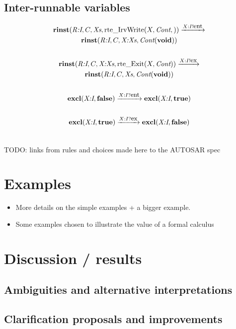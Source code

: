 \documentclass[twocolumn]{article}
\newcommand{\V}[1]{\mbox{\it #1}}
\newcommand{\Cont}{\V{Cont}}
\newcommand{\Xs}{\V{Xs}}
\newcommand{\void}{\mbox{\bf void}}
\newcommand{\true}{\mbox{\bf true}}
\newcommand{\false}{\mbox{\bf false}}
\newcommand{\adr}[1]{\mbox{\em #1}}
\newcommand{\rinst}[4]{\mbox{\bf rinst}(#1,#2,#3,#4)}
\newcommand{\excl}[2]{\mbox{\bf excl}(#1,#2)}
\newcommand{\Exit}[2]{\mbox{rte\_Exit}(#1,#2)}
\newcommand{\IrvWrite}[3]{\mbox{rte\_IrvWrite}(#1,#2,#3)}
\newcommand{\red}[1]{\xrightarrow{#1}}
\newcommand{\say}[2]{#1 ! #2}
\newcommand{\hear}[2]{#1 ? #2}
\newcommand{\ent}{\mbox{\small ent}}
\newcommand{\ex}{\mbox{\small ex}}
\begin{document}
\subsection{Inter-runnable variables}

\begin{gather*}
	\rinst{\adr{R:I}}{C}{\Xs}{\IrvWrite{X}{\Cont}}  \red{\say{X:I}{\ent}}  \\
		\rinst{\adr{R:I}}{C}{\adr{X:Xs}}{\Cont(\void)} \\
	\\
	\rinst{\adr{R:I}}{C}{\adr{X:Xs}}{\Exit{X}{\Cont}}  \red{\say{X:I}{\ex}}  \\
		\rinst{\adr{R:I}}{C}{\Xs}{\Cont(\void)} \\
	\\
	\excl{\adr{X:I}}{\false} \red{\hear{X:I}{\ent}} \excl{\adr{X:I}}{\true} \\
	\\
	\excl{\adr{X:I}}{\true} \red{\hear{X:I}{\ex}} \excl{\adr{X:I}}{\false} \\
	\\
\end{gather*}


TODO: links from rules and choices made here to the AUTOSAR spec

\section{Examples}
\label{sec:Examples}

\begin{itemize}
\item More details on the simple examples + a bigger example.
\item Some examples chosen to illustrate the value of a formal calculus
\end{itemize}

\section{Discussion / results}
\label{sec:Disc}

\subsection{Ambiguities and alternative interpretations}
\label{sec:DiscAmb}

\subsection{Clarification proposals and improvements}
\label{sec:DiscImp}
\end{document}
